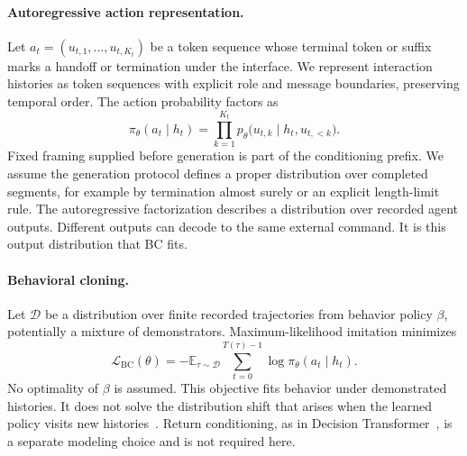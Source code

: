 \documentclass{article} %
\begin{document}
\paragraph{Autoregressive action representation.}
Let $a_t=(u_{t,1},\ldots,u_{t,K_t})$ be a token sequence whose terminal token or suffix marks a handoff or termination under the interface. We represent interaction histories as token sequences with explicit role and message boundaries, preserving temporal order. The action probability factors as
\begin{equation}
 \pi_\theta(a_t\mid h_t)
 =\prod_{k=1}^{K_t}p_\theta\bigl(u_{t,k}\mid
 h_t,u_{t,<k}\bigr).
 \label{eq:action}
\end{equation}
Fixed framing supplied before generation is part of the conditioning prefix. We assume the generation protocol defines a proper distribution over completed segments, for example by termination almost surely or an explicit length-limit rule. The autoregressive factorization describes a distribution over recorded agent outputs. Different outputs can decode to the same external command. It is this output distribution that BC fits.

\paragraph{Behavioral cloning.}
Let $\mathcal D$ be a distribution over finite recorded trajectories from behavior policy $\beta$, potentially a mixture of demonstrators. Maximum-likelihood imitation minimizes
\begin{equation}
 \mathcal L_{\mathrm{BC}}(\theta)
 =-\mathbb E_{\tau\sim\mathcal D}\sum_{t=0}^{T(\tau)-1}
 \log\pi_\theta(a_t\mid h_t).
 \label{eq:bc}
\end{equation}
No optimality of $\beta$ is assumed. This objective fits behavior under demonstrated histories. It does not solve the distribution shift that arises when the learned policy visits new histories~\citep{ross2011reduction}. Return conditioning, as in Decision Transformer~\citep{chen2021decision}, is a separate modeling choice and is not required here.
\end{document}
